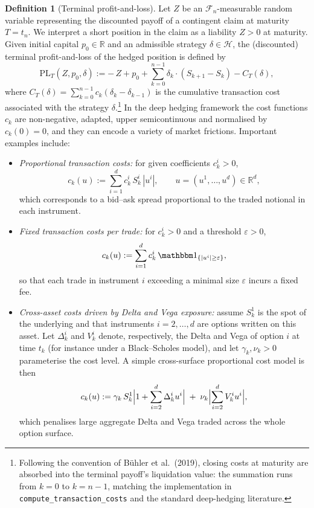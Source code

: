 \documentclass[12pt,a4paper]{article}
\theoremstyle{definition}
\newtheorem{definition}{Definition}[section]
\theoremstyle{plain}
\theoremstyle{remark}
\theoremstyle{plain}
\begin{document}
\begin{definition}[Terminal profit-and-loss]
\label{def:terminal_PL}
Let $Z$ be an $\mathcal F_n$-measurable random variable representing the discounted payoff of a contingent claim at maturity $T=t_n$. 
We interpret a short position in the claim as a liability $Z>0$ at maturity.
Given initial capital $p_0\in\mathbb R$ and an admissible strategy $\delta\in\mathcal H$, the (discounted) terminal profit-and-loss of the hedged position is defined by
\begin{equation}
\label{eq:terminal_PL_compact}
    \mathrm{PL}_T(Z,p_0,\delta)
    :=
    -\,Z + p_0 
    + \sum_{k=0}^{n-1} \delta_k \cdot (S_{k+1} - S_k)
    - C_T(\delta),
\end{equation}
where $C_T(\delta)=\sum_{k=0}^{n-1} c_k(\delta_k-\delta_{k-1})$ is the cumulative transaction cost associated with the strategy $\delta$.\footnote{Following the convention of B\"uhler et al.\ (2019), closing costs at maturity are absorbed into the terminal payoff's liquidation value: the summation runs from $k=0$ to $k=n-1$, matching the implementation in \texttt{compute\_transaction\_costs} and the standard deep-hedging literature.}
In the deep hedging framework \cite{Buehler2019DeepHedging} the cost functions $c_k$ are non-negative, adapted, upper semicontinuous and normalised by $c_k(0)=0$, and they can encode a variety of market frictions. 
Important examples include:
\begin{itemize}
    \item \emph{Proportional transaction costs:} for given coefficients $c_k^i>0$,
    \[
        c_k(u) := \sum_{i=1}^d c_k^i\, S_k^i\, |u^i|, \qquad u=(u^1,\dots,u^d)\in\mathbb R^d,
    \]
    which corresponds to a bid--ask spread proportional to the traded notional in each instrument.
    \item \emph{Fixed transaction costs per trade:} for $c_k^i>0$ and a threshold $\varepsilon>0$,
    \[
        c_k(u) := \sum_{i=1}^d c_k^i\, \mathbbm 1_{\{|u^i|\ge \varepsilon\}},
    \]
    so that each trade in instrument $i$ exceeding a minimal size $\varepsilon$ incurs a fixed fee.
    \item \emph{Cross-asset costs driven by Delta and Vega exposure:} assume $S_k^1$ is the spot of the underlying and that instruments $i=2,\dots,d$ are options written on this asset.
    Let $\Delta_k^i$ and $V_k^i$ denote, respectively, the Delta and Vega of option $i$ at time $t_k$ (for instance under a Black--Scholes model), and let $\gamma_k,\nu_k>0$ parameterise the cost level.
    A simple cross-surface proportional cost model is then
    \[
        c_k(u)
        := \gamma_k\, S_k^1 \Bigl| 1 + \sum_{i=2}^d \Delta_k^i u^i \Bigr|
         \;+\; \nu_k \Bigl| \sum_{i=2}^d V_k^i u^i \Bigr|,
    \]
    which penalises large aggregate Delta and Vega traded across the whole option surface.
\end{itemize}
\end{definition}
\end{document}
